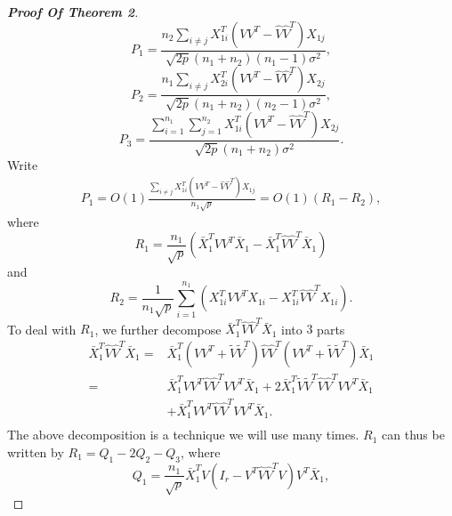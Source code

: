 \begin{proof}[\textbf{Proof Of Theorem 2}]
\begin{equation*}
        P_1=\frac{n_2\sum_{i\neq j}X_{1i}^T(VV^T-\hat{V}\hat{V}^T)X_{1j}}{\sqrt{2p}(n_1+n_2)(n_1-1)\sigma^2},
\end{equation*}
\begin{equation*}
        P_2=\frac{n_1\sum_{i\neq j}X_{2i}^T(VV^T-\hat{V}\hat{V}^T)X_{2j}}{\sqrt{2p}(n_1+n_2)(n_2-1)\sigma^2},
\end{equation*}
\begin{equation*}
        P_3=\frac{\sum_{i=1}^{n_1}\sum_{j=1}^{n_2}X_{1i}^T(VV^T-\hat{V}\hat{V}^T)X_{2j}}{\sqrt{2p}(n_1+n_2)\sigma^2}.
\end{equation*}
Write
\begin{equation*}
    \begin{aligned}
        P_1=O(1)\frac{\sum_{i\neq j}X_{1i}^T(VV^T-\hat{V}\hat{V}^T)X_{1j}}{n_1\sqrt{p}}
        =O(1)(R_1-R_2),
    \end{aligned}
\end{equation*}
where
\begin{equation*}
    R_1=\frac{n_1}{\sqrt{p}}(\bar{X}_1^T VV^T\bar{X}_1-\bar{X}_1^T \hat{V}\hat{V}^T\bar{X}_1)
\end{equation*}
and 
\begin{equation*}
    R_2=\frac{1}{n_1\sqrt{p}}\sum_{i=1}^{n_1}(X_{1i}^T VV^T X_{1i}-X_{1i}^T \hat{V}\hat{V}^T X_{1i}).
\end{equation*}
To deal with $R_1$, we further decompose $\bar{X}_1^T \hat{V}\hat{V}^T\bar{X}_1$  into $3$ parts
    \begin{equation*}
    \begin{aligned} 
        \bar{X}_1^T \hat{V}\hat{V}^T\bar{X}_1=&
        \bar{X}_1^T (VV^T+\tilde{V}\tilde{V}^T) \hat{V}\hat{V}^T (VV^T+\tilde{V}\tilde{V}^T)\bar{X}_1\\
        =&\bar{X}_1^T VV^T \hat{V}\hat{V}^T VV^T \bar{X}_1
        +2\bar{X}_1^T \tilde{V}\tilde{V}^T \hat{V}\hat{V}^T VV^T \bar{X}_1\\
        &+\bar{X}_1^T VV^T \hat{V}\hat{V}^T VV^T \bar{X}_1.\\
    \end{aligned}
    \end{equation*} 
    The above decomposition is a technique we will use many times. $R_1$ can thus be written by $R_1=Q_1-2Q_2-Q_3$, where
    \begin{equation*}
        Q_1=\frac{n_1}{\sqrt{p}}\bar{X}_1^T V(I_r-V^T\hat{V}\hat{V}^T V)V^T \bar{X}_1,
    \end{equation*}

\end{proof}
